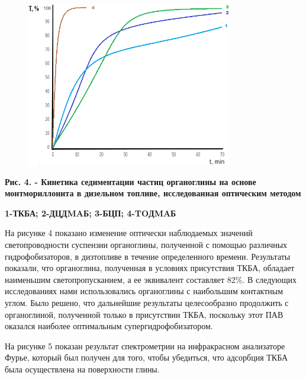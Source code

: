 \begin{figure}[H]
	\centering
	\includegraphics[width=0.8\textwidth]{assets/1028}
	\caption*{}
\end{figure}

{\bfseries Рис. 4. - Кинетика седиментации частиц органоглины на основе
монтмориллонита в дизельном топливе, исследованная оптическим методом}

{\bfseries 1-ТКБА; 2-ДЦДMAБ; 3-БЦП; 4-TOДMAБ}

На рисунке 4 показано изменение оптически наблюдаемых значений
светопроводности суспензии органоглины, полученной с помощью различных
гидрофобизаторов, в дизтопливе в течение определенного времени.
Результаты показали, что органоглина, полученная в условиях присутствия
ТКБА, обладает наименьшим светопропусканием, а ее эквивалент составляет
82\%. В следующих исследованиях нами использовались органоглины с
наибольшим контактным углом. Было решено, что дальнейшие результаты
целесообразно продолжить с органоглиной, полученной только в присутствии
ТКБА, поскольку этот ПАВ оказался наиболее оптимальным
супергидрофобизатором.

На рисунке 5 показан результат спектрометрии на инфракрасном анализаторе
Фурье, который был получен для того, чтобы убедиться, что адсорбция ТКБА
была осуществлена на поверхности глины.

